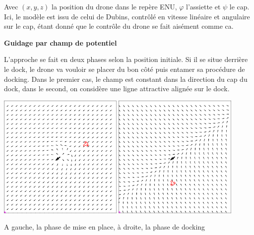 \documentclass[portrait,final,a0paper,fontscale=0.3]{baposter}
\begin{document}
\begin{poster}
{	Avec $(x,y,z)$ la position du drone dans le repère ENU, $\varphi$ l'assiette et $\psi$ le cap. Ici,
	le modèle est issu de celui de Dubins, contrôlé en vitesse linéaire et angulaire sur le cap, étant
	donné que le contrôle du drone se fait aisément comme ca.


	
    
    \vspace{\baselineskip}

	\begin{center}
		\textbf{Guidage par champ de potentiel}
	\end{center}

	L'approche se fait en deux phases selon la position initiale. Si il se situe derrière le dock,
	le drone va vouloir se placer du bon côté puis entamer sa procédure de docking. Dans le premier cas,
	le champ est constant dans la direction du cap du dock, dans le second, on considère une ligne attractive
	alignée sur le dock.

	\begin{center}
		\includegraphics[width =0.45\textwidth]{imgs/ScreenshotCase2.png}
		\includegraphics[width =0.45\textwidth]{imgs/ScreenshotCase1.png}
	\end{center}
	A gauche, la phase de mise en place, à droite, la phase de docking
}


\end{poster}
\end{document}
